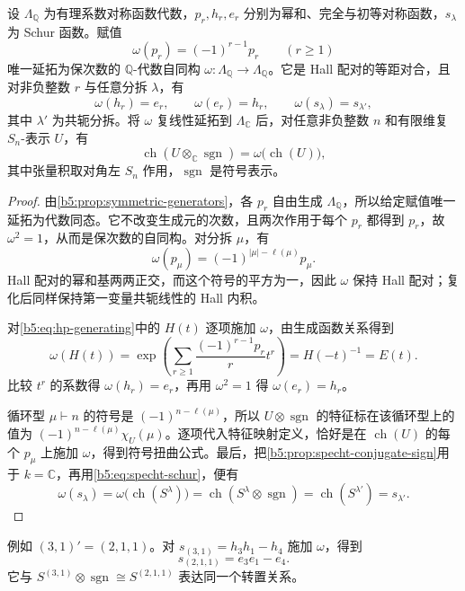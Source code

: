 \begin{proposition}\label{b5:prop:omega-sign-conjugation}
	设 \(\Lambda_{\mathbb Q}\) 为有理系数对称函数代数，\(p_r,h_r,e_r\) 分别为幂和、完全与初等对称函数，\(s_\lambda\) 为 Schur 函数。赋值
	\[
		\omega(p_r)=(-1)^{r-1}p_r\qquad(r\ge1)
	\]
	唯一延拓为保次数的 \(\mathbb Q\)-代数自同构 \(\omega:\Lambda_{\mathbb Q}\to\Lambda_{\mathbb Q}\)。它是 Hall 配对的等距对合，且对非负整数 \(r\) 与任意分拆 \(\lambda\)，有
	\[
		\omega(h_r)=e_r,\qquad \omega(e_r)=h_r,\qquad \omega(s_\lambda)=s_{\lambda'},
	\]
	其中 \(\lambda'\) 为共轭分拆。将 \(\omega\) 复线性延拓到 \(\Lambda_{\mathbb C}\) 后，对任意非负整数 \(n\) 和有限维复 \(S_n\)-表示 \(U\)，有
	\[
		\operatorname{ch}(U\otimes_{\mathbb C}\operatorname{sgn}) =\omega\bigl(\operatorname{ch}(U)\bigr),
	\]
	其中张量积取对角左 \(S_n\) 作用，\(\operatorname{sgn}\) 是符号表示。
\end{proposition}
\begin{proof}
	由\cref{b5:prop:symmetric-generators}，各 \(p_r\) 自由生成 \(\Lambda_{\mathbb Q}\)，所以给定赋值唯一延拓为代数同态。它不改变生成元的次数，且两次作用于每个 \(p_r\) 都得到 \(p_r\)，故 \(\omega^2=1\)，从而是保次数的自同构。对分拆 \(\mu\)，有
	\[
		\omega(p_\mu)=(-1)^{|\mu|-\ell(\mu)}p_\mu.
	\]
	Hall 配对的幂和基两两正交，而这个符号的平方为一，因此 \(\omega\) 保持 Hall 配对；复化后同样保持第一变量共轭线性的 Hall 内积。

	对\eqref{b5:eq:hp-generating}中的 \(H(t)\) 逐项施加 \(\omega\)，由生成函数关系得到
	\[
		\omega(H(t)) =\exp\left(\sum_{r\ge1}\frac{(-1)^{r-1}p_r}{r}t^r\right) =H(-t)^{-1}=E(t).
	\]
	比较 \(t^r\) 的系数得 \(\omega(h_r)=e_r\)，再用 \(\omega^2=1\) 得 \(\omega(e_r)=h_r\)。

	循环型 \(\mu\vdash n\) 的符号是 \((-1)^{n-\ell(\mu)}\)，所以 \(U\otimes\operatorname{sgn}\) 的特征标在该循环型上的值为 \((-1)^{n-\ell(\mu)}\chi_U(\mu)\)。逐项代入特征映射定义，恰好是在 \(\operatorname{ch}(U)\) 的每个 \(p_\mu\) 上施加 \(\omega\)，得到符号扭曲公式。最后，把\cref{b5:prop:specht-conjugate-sign}用于 \(k=\mathbb C\)，再用\eqref{b5:eq:specht-schur}，便有
	\[
		\omega(s_\lambda) =\omega\bigl(\operatorname{ch}(S^\lambda)\bigr) =\operatorname{ch}(S^\lambda\otimes\operatorname{sgn}) =\operatorname{ch}(S^{\lambda'})=s_{\lambda'}.
	\]
\end{proof}

例如 \((3,1)'=(2,1,1)\)。对 \(s_{(3,1)}=h_3h_1-h_4\) 施加 \(\omega\)，得到
\[
	s_{(2,1,1)}=e_3e_1-e_4.
\]
它与 \(S^{(3,1)}\otimes\operatorname{sgn}\cong S^{(2,1,1)}\) 表达同一个转置关系。


